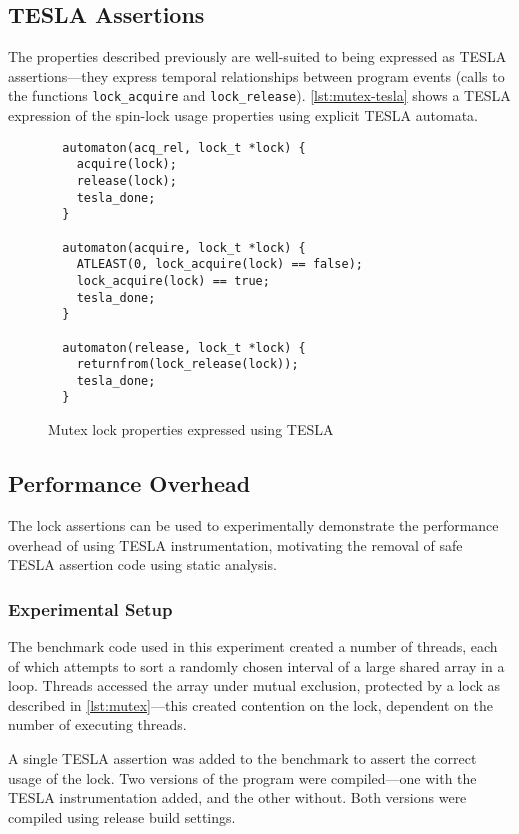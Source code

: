 \subsection{TESLA Assertions}

The properties described previously are well-suited to being expressed as TESLA
assertions---they express temporal relationships between program events (calls
to the functions \texttt{lock_acquire} and \texttt{lock_release}).
\autoref{lst:mutex-tesla} shows a TESLA expression of the spin-lock usage
properties using explicit TESLA automata.
\begin{figure}
  \begin{verbatim}
  automaton(acq_rel, lock_t *lock) {
    acquire(lock);
    release(lock);
    tesla_done;
  }

  automaton(acquire, lock_t *lock) {
    ATLEAST(0, lock_acquire(lock) == false);
    lock_acquire(lock) == true;
    tesla_done;
  }

  automaton(release, lock_t *lock) {
    returnfrom(lock_release(lock));
    tesla_done;
  }
  \end{verbatim}
  \caption{Mutex lock properties expressed using TESLA}
  \label{lst:mutex-tesla}
\end{figure}

\subsection{Performance Overhead}

The lock assertions can be used to experimentally demonstrate the performance
overhead of using TESLA instrumentation, motivating the removal of safe TESLA
assertion code using static analysis.

\subsubsection{Experimental Setup}

The benchmark code used in this experiment created a number of threads, each of
which attempts to sort a randomly chosen interval of a large shared array in a
loop. Threads accessed the array under mutual exclusion, protected by a lock as
described in \autoref{lst:mutex}---this created contention on the lock,
dependent on the number of executing threads.

A single TESLA assertion was added to the benchmark to assert the correct usage
of the lock. Two versions of the program were compiled---one with the TESLA
instrumentation added, and the other without. Both versions were compiled using
release build settings.

